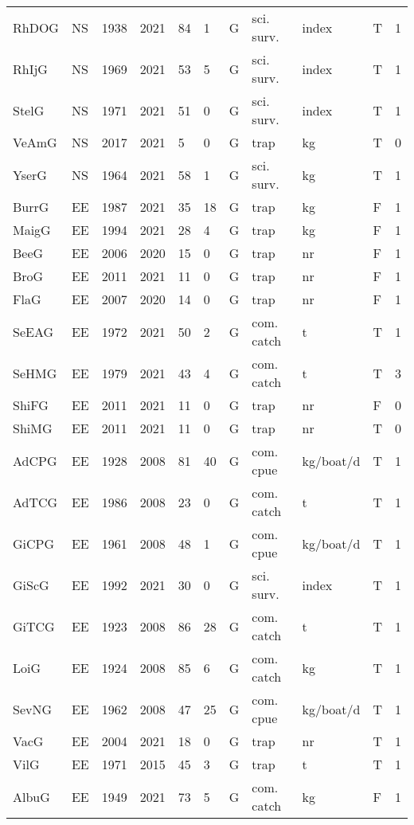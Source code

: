 \begin{table}[htbp]
\begin{tabular}{p{1cm}p{1cm}p{1cm}p{1cm}p{0.8cm}p{0.8cm}p{1cm}p{2cm}p{2cm}p{1cm}p{1cm}}
  RhDOG & NS & 1938 & 2021 & 84 & 1 & G & sci. surv. & index & T & 1 \\ 
  RhIjG & NS & 1969 & 2021 & 53 & 5 & G & sci. surv. & index & T & 1 \\ 
  StelG & NS & 1971 & 2021 & 51 & 0 & G & sci. surv. & index & T & 1 \\ 
  VeAmG & NS & 2017 & 2021 & 5 & 0 & G & trap & kg & T & 0 \\ 
  YserG & NS & 1964 & 2021 & 58 & 1 & G & sci. surv. & kg & T & 1 \\ 
  BurrG & EE & 1987 & 2021 & 35 & 18 & G & trap & kg & F & 1 \\ 
  MaigG & EE & 1994 & 2021 & 28 & 4 & G & trap & kg & F & 1 \\ 
  BeeG & EE & 2006 & 2020 & 15 & 0 & G & trap & nr & F & 1 \\ 
  BroG & EE & 2011 & 2021 & 11 & 0 & G & trap & nr & F & 1 \\ 
  FlaG & EE & 2007 & 2020 & 14 & 0 & G & trap & nr & F & 1 \\ 
  SeEAG & EE & 1972 & 2021 & 50 & 2 & G & com. catch & t & T & 1 \\ 
  SeHMG & EE & 1979 & 2021 & 43 & 4 & G & com. catch & t & T & 3 \\ 
  ShiFG & EE & 2011 & 2021 & 11 & 0 & G & trap & nr & F & 0 \\ 
  ShiMG & EE & 2011 & 2021 & 11 & 0 & G & trap & nr & T & 0 \\ 
  AdCPG & EE & 1928 & 2008 & 81 & 40 & G & com. cpue & kg/boat/d & T & 1 \\ 
  AdTCG & EE & 1986 & 2008 & 23 & 0 & G & com. catch & t & T & 1 \\ 
  GiCPG & EE & 1961 & 2008 & 48 & 1 & G & com. cpue & kg/boat/d & T & 1 \\ 
  GiScG & EE & 1992 & 2021 & 30 & 0 & G & sci. surv. & index & T & 1 \\ 
  GiTCG & EE & 1923 & 2008 & 86 & 28 & G & com. catch & t & T & 1 \\ 
  LoiG & EE & 1924 & 2008 & 85 & 6 & G & com. catch & kg & T & 1 \\ 
  SevNG & EE & 1962 & 2008 & 47 & 25 & G & com. cpue & kg/boat/d & T & 1 \\ 
  VacG & EE & 2004 & 2021 & 18 & 0 & G & trap & nr & T & 1 \\ 
  VilG & EE & 1971 & 2015 & 45 & 3 & G & trap & t & T & 1 \\ 
  AlbuG & EE & 1949 & 2021 & 73 & 5 & G & com. catch & kg & F & 1 \\ 

\end{tabular}
\end{table}

